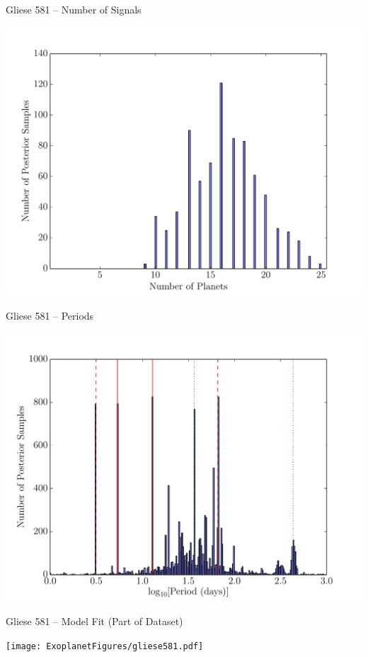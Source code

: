 \begin{frame}[t]{Gliese 581 -- Number of Signals}
\begin{center}
\includegraphics[scale=0.35]{ExoplanetFigures/gliese581_N.pdf}
\end{center}
\end{frame}


\begin{frame}[t]{Gliese 581 -- Periods}
\begin{center}
\includegraphics[scale=0.4]{ExoplanetFigures/gliese581_periods.pdf}
\end{center}
\end{frame}


\begin{frame}[t]{Gliese 581 -- Model Fit (Part of Dataset)}
\begin{center}
\texttt{[image: ExoplanetFigures/gliese581.pdf]}
\end{center}
\end{frame}


